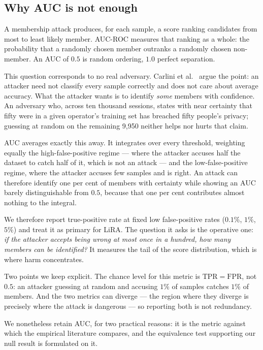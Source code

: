 \subsection{Why AUC is not enough}
\label{sec:attacks-metrics}

A membership attack produces, for each sample, a score ranking candidates from
most to least likely member. AUC-ROC measures that ranking as a whole: the
probability that a randomly chosen member outranks a randomly chosen
non-member. An AUC of $0.5$ is random ordering, $1.0$ perfect separation.

This question corresponds to no real adversary. Carlini et
al.~\cite{carlini2022membership} argue the point: an attacker need not classify
every sample correctly and does not care about average accuracy. What the
attacker wants is to identify \emph{some} members with confidence. An
adversary who, across ten thousand sessions, states with near certainty that
fifty were in a given operator's training set has breached fifty people's
privacy; guessing at random on the remaining 9,950 neither helps nor hurts
that claim.

AUC averages exactly this away. It integrates over every threshold, weighting
equally the high-false-positive regime --- where the attacker accuses half the
dataset to catch half of it, which is not an attack --- and the
low-false-positive regime, where the attacker accuses few samples and is
right. An attack can therefore identify one per cent of members with certainty
while showing an AUC barely distinguishable from $0.5$, because that one per
cent contributes almost nothing to the integral.

We therefore report true-positive rate at fixed low false-positive rates
($0.1\%$, $1\%$, $5\%$) and treat it as primary for LiRA. The question it asks
is the operative one: \emph{if the attacker accepts being wrong at most once in
a hundred, how many members can be identified?} It measures the tail of the
score distribution, which is where harm concentrates.

Two points we keep explicit. The chance level for this metric is
$\mathrm{TPR} = \mathrm{FPR}$, not $0.5$: an attacker guessing at random and
accusing $1\%$ of samples catches $1\%$ of members. And the two metrics can
diverge --- the region where they diverge is precisely where the attack is
dangerous --- so reporting both is not redundancy.

We nonetheless retain AUC, for two practical reasons: it is the metric against
which the empirical literature compares, and the equivalence test supporting
our null result is formulated on it.
